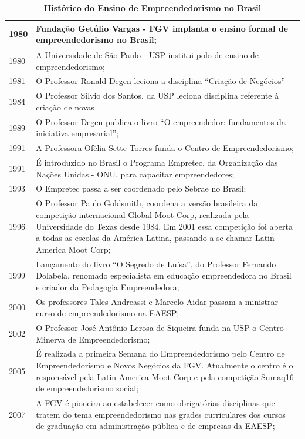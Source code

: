 \begin{table}[htb]
\caption{\label{tabela_1}\textbf{Histórico do Ensino de Empreendedorismo no Brasil}}
\begin{tabular}{p{1.5cm}p{13.0cm}}
\hline \hline
1980 & Fundação Getúlio Vargas - FGV implanta o ensino formal de empreendedorismo no Brasil;  \\\hline
1980 & A Universidade de São Paulo - USP institui polo de ensino de empreendedorismo;  \\\hline
1981 & O Professor Ronald Degen leciona a disciplina “Criação de Negócios”  \\ \hline
1984 & O Professor Sílvio dos Santos, da USP leciona disciplina referente à criação de novas \\ \hline
1989 & O Professor Degen publica o livro “O empreendedor: fundamentos da iniciativa empresarial”;  \\\hline
1991 & A Professora Ofélia Sette Torres funda o Centro de Empreendedorismo;  \\\hline
1991 & É introduzido no Brasil o Programa Empretec, da Organização das Nações Unidas - ONU, para
capacitar empreendedores;  \\\hline
1993 & O Empretec passa a ser coordenado pelo Sebrae no Brasil;  \\\hline
1996 & O Professor Paulo Goldsmith, coordena a versão brasileira da competição internacional Global Moot Corp, realizada pela Universidade do Texas desde 1984. Em 2001 essa competição foi aberta a todas as escolas da América Latina, passando a se chamar Latin America Moot Corp;\\\hline
1999 & Lançamento do livro “O Segredo de Luísa”, do Professor Fernando Dolabela, renomado
especialista em educação empreendedora no Brasil e criador da Pedagogia Empreendedora;  \\ \hline
2000 & Os professores Tales Andreassi e Marcelo Aidar passam a ministrar curso de empreendedorismo
na EAESP;  \\ \hline
 2002 & O Professor José Antônio Lerosa de Siqueira funda na USP o Centro Minerva de Empreendedorismo;  \\\hline 
   2005 & É realizada a primeira Semana do Empreendedorismo pelo Centro de Empreendedorismo e Novos Negócios da FGV. Atualmente o centro é o responsável pela Latin America Moot Corp e pela competição Sumaq16 de empreendedorismo social;  \\\hline 
   2007 & A FGV é pioneira ao estabelecer como obrigatórias disciplinas que tratem do tema empreendedorismo nas grades curriculares dos cursos de graduação em administração pública e de empresas da EAESP; \\\hline 
\end{tabular}
\end{table}

